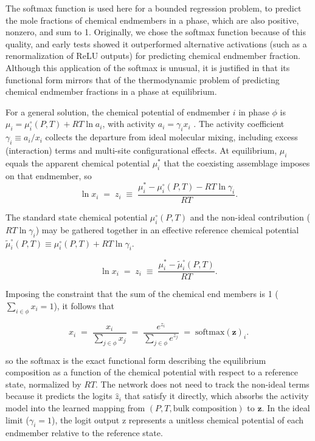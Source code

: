 The softmax function is used here for a bounded regression problem, to predict the mole fractions of chemical endmembers in a phase, which are also positive, nonzero, and sum to 1. 
Originally, we chose the softmax function because of this quality, and early tests showed it outperformed alternative activations (such as a renormalization of ReLU outputs) 
for predicting chemical endmember fraction. Although this application of the softmax is unusual, it is justified in that its functional form mirrors that of the thermodynamic 
problem of predicting chemical endmember fractions in a phase at equilibrium.

For a general solution, the chemical potential of endmember $i$ in phase $\phi$ is
$\mu_i = \mu_i^{\circ}(P,T) + RT\ln a_i$, with activity $a_i = \gamma_i x_i$ \citep[e.g.,][]{anderson2005,ganguly2008}. The activity coefficient $\gamma_i \equiv a_i/x_i$
collects the departure from ideal molecular mixing, including excess (interaction)
terms and multi-site configurational effects. At equilibrium, $\mu_i$ equals the apparent chemical potential
$\mu_i^{*}$ that the coexisting assemblage imposes on that endmember, so
\begin{equation}
  \ln x_i \;=\; z_i \;\equiv\; \frac{\mu_i^{*} - \mu_i^{\circ}(P,T) - RT\ln\gamma_i}{RT}.
  \label{eq:nonideal_z}
\end{equation}

The standard state chemical potential $\mu_i^{\circ}(P,T)$ and the non-ideal contribution ($RT\ln\gamma_i$) may be gathered together in 
an effective reference chemical potential $\tilde{\mu}_i^{\circ}(P,T) \equiv \mu_i^{\circ}(P,T) + RT\ln\gamma_i$.

\begin{equation}
  \ln x_i \;=\; z_i \;\equiv\; \frac{\mu_i^{*} - \tilde{\mu}_i^{\circ}(P,T)}{RT}.
  \label{eq:gathered_z}
\end{equation}

Imposing the constraint that the sum of the chemical end members is 1 ($\sum_{i\in\phi} x_i = 1$), it follows that

\begin{equation}
  x_i \;=\; \frac{x_i}{\sum_{j\in\phi} x_j} \;=\; \frac{e^{z_i}}{\sum_{j\in\phi} e^{z_j}}
  \;=\; \text{softmax} (\bm{z})_i .
  \label{eq:ideal_softmax}
\end{equation}

so the softmax is the exact functional form describing the equilibrium composition as a function 
of the chemical potential with respect to a reference state, normalized by $RT$. The network does not 
need to track the non-ideal terms because it predicts the logits $\hat{z}_i$ that satisfy it
directly, which absorbs the activity model into the learned mapping from
$(P, T, \text{bulk composition})$ to $\bm{z}$. In the ideal limit ($\gamma_i = 1$),
the logit output z represents a unitless chemical potential of each endmember relative to the reference state.

